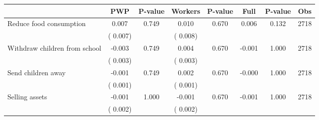 
\begin{tabular}{l*{7}{c}}\hline&\multicolumn{1}{c}{PWP}&\multicolumn{1}{c}{P-value}&\multicolumn{1}{c}{Workers}&\multicolumn{1}{c}{P-value}&\multicolumn{1}{c}{Full}&\multicolumn{1}{c}{P-value}&\multicolumn{1}{c}{Obs} \\ \hline

 Reduce food consumption       &              0.007       &        0.749  &              0.010       &        0.670  &              0.006       &              0.132 &  2718 \\ 
                       &       (       0.007)             &                               &       (       0.008)                     &                               &                                               &                                &                      \\ 

 Withdraw children from school       &             -0.003       &        0.749  &              0.004       &        0.670  &             -0.001       &              1.000 &  2718 \\ 
                       &       (       0.003)             &                               &       (       0.003)                     &                               &                                               &                                &                      \\ 

 Send children away       &             -0.001       &        0.749  &              0.002       &        0.670  &             -0.000       &              1.000 &  2718 \\ 
                       &       (       0.001)             &                               &       (       0.001)                     &                               &                                               &                                &                      \\ 

 Selling assets       &             -0.001       &        1.000  &             -0.001       &        0.670  &             -0.001       &              1.000 &  2718 \\ 
                       &       (       0.002)             &                               &       (       0.002)                     &                               &                                               &                                &                      \\ 


\end{tabular}
